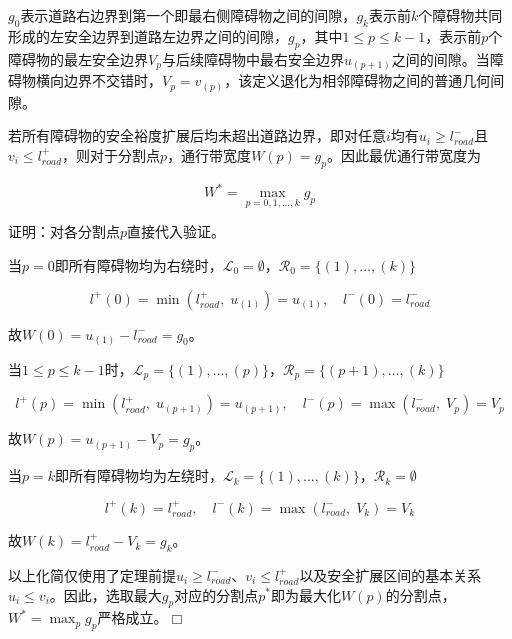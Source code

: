 $g_0$表示道路右边界到第一个即最右侧障碍物之间的间隙，$g_k$表示前$k$个障碍物共同形成的左安全边界到道路左边界之间的间隙，$g_p$，其中$1 \leq p \leq k-1$，表示前$p$个障碍物的最左安全边界$V_p$与后续障碍物中最右安全边界$u_{(p+1)}$之间的间隙。当障碍物横向边界不交错时，$V_p=v_{(p)}$，该定义退化为相邻障碍物之间的普通几何间隙。

\begin{theorem}[最大间隙最优性]
\label{thm:max_gap}
若所有障碍物的安全裕度扩展后均未超出道路边界，即对任意$i$均有$u_i \geq l_{road}^{-}$且$v_i \leq l_{road}^{+}$，则对于分割点$p$，通行带宽度$W(p) = g_p$。因此最优通行带宽度为

\begin{equation}
    W^{*} = \max_{p=0,1,\ldots,k} g_p
    \label{eq:max_gap_opt}
\end{equation}
\end{theorem}

证明：对各分割点$p$直接代入验证。

当$p = 0$即所有障碍物均为右绕时，$\mathcal{L}_0 = \emptyset$，$\mathcal{R}_0 = \{(1), \ldots, (k)\}$

\begin{equation}
    l^{+}(0) = \min(l_{road}^{+},\; u_{(1)}) = u_{(1)}, \quad l^{-}(0) = l_{road}^{-}
\end{equation}

故$W(0) = u_{(1)} - l_{road}^{-} = g_0$。

当$1 \leq p \leq k-1$时，$\mathcal{L}_p = \{(1), \ldots, (p)\}$，$\mathcal{R}_p = \{(p+1), \ldots, (k)\}$

\begin{equation}
    l^{+}(p) = \min(l_{road}^{+},\; u_{(p+1)}) = u_{(p+1)}, \quad l^{-}(p) = \max(l_{road}^{-},\; V_p) = V_p
\end{equation}

故$W(p) = u_{(p+1)} - V_p = g_p$。

当$p = k$即所有障碍物均为左绕时，$\mathcal{L}_k = \{(1), \ldots, (k)\}$，$\mathcal{R}_k = \emptyset$

\begin{equation}
    l^{+}(k) = l_{road}^{+}, \quad l^{-}(k) = \max(l_{road}^{-},\; V_k) = V_k
\end{equation}

故$W(k) = l_{road}^{+} - V_k = g_k$。

以上化简仅使用了定理前提$u_i \geq l_{road}^{-}$、$v_i \leq l_{road}^{+}$以及安全扩展区间的基本关系$u_i\leq v_i$。因此，选取最大$g_p$对应的分割点$p^{*}$即为最大化$W(p)$的分割点，$W^{*} = \max_p g_p$严格成立。\hfill$\Box$

